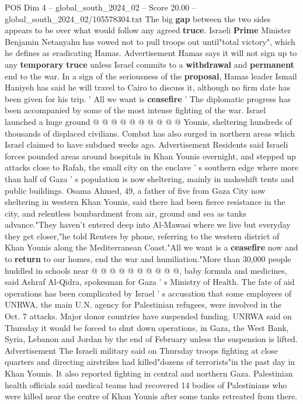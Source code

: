 \begin{textsample}{POS Dim 4 – global\_south\_2024\_02 – Score 20.00 – global\_south\_2024\_02/105578304.txt}
The big \textbf{gap} between the two sides appears to be over what would follow any agreed \textbf{truce}.
Israeli \textbf{Prime} Minister Benjamin Netanyahu has vowed not to pull troops out until"total victory", which he defines as eradicating Hamas.
Advertisement Hamas says it will not sign up to any \textbf{temporary} \textbf{truce} unless Israel commits to a \textbf{withdrawal} and \textbf{permanent} end to the war.
In a sign of the seriousness of the \textbf{proposal}, Hamas leader Ismail Haniyeh has said he will travel to Cairo to discuss it, although no firm date has been given for his trip. ' All we want is \textbf{ceasefire} ' The diplomatic progress has been accompanied by some of the most intense fighting of the war.
Israel launched a huge ground @ @ @ @ @ @ @ @ @ @ Younis, sheltering hundreds of thousands of displaced civilians.
Combat has also surged in northern areas which Israel claimed to have subdued weeks ago.
Advertisement Residents said Israeli forces pounded areas around hospitals in Khan Younis overnight, and stepped up attacks close to Rafah, the small city on the enclave ' s southern edge where more than half of Gaza ' s population is now sheltering, mainly in makeshift tents and public buildings.
Osama Ahmed, 49, a father of five from Gaza City now sheltering in western Khan Younis, said there had been fierce resistance in the city, and relentless bombardment from air, ground and sea as tanks advance."They haven't entered deep into Al-Mawasi where we live but everyday they get closer,"he told Reuters by phone, referring to the western district of Khan Younis along the Mediterranean Coast."All we want is a \textbf{ceasefire} now and to \textbf{return} to our homes, end the war and humiliation."More than 30,000 people huddled in schools near @ @ @ @ @ @ @ @ @ @, baby formula and medicines, said Ashraf Al-Qidra, spokesman for Gaza ' s Ministry of Health.
The fate of aid operations has been complicated by Israel ' s accusation that some employees of UNRWA, the main U.N. agency for Palestinian refugees, were involved in the Oct. 7 attacks.
Major donor countries have suspended funding.
UNRWA said on Thursday it would be forced to shut down operations, in Gaza, the West Bank, Syria, Lebanon and Jordan by the end of February unless the suspension is lifted.
Advertisement The Israeli military said on Thursday troops fighting at close quarters and directing airstrikes had killed"dozens of terrorists"in the past day in Khan Younis.
It also reported fighting in central and northern Gaza.
Palestinian health officials said medical teams had recovered 14 bodies of Palestinians who were killed near the centre of Khan Younis after some tanks retreated from there.

\end{textsample}
